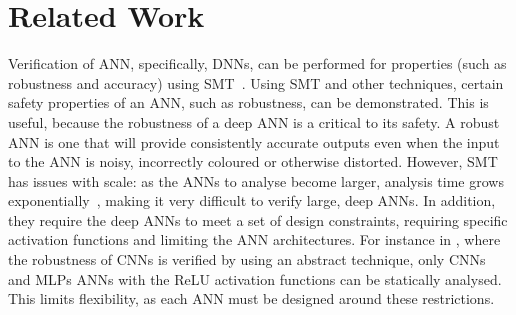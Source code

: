 \section{Related Work}
\label{sec:related}


Verification of \ac{ANN}, specifically, \acfp{DNN}, can be performed for properties (such as robustness and accuracy) using \ac{SMT}~\cite{Gehr2018AI2SA,reluplex,DeepANNverify}. 
Using \ac{SMT} and other techniques, certain safety properties of an \ac{ANN}, such as robustness, can be demonstrated. 
This is useful, because the robustness of a deep \ac{ANN} is a critical to its safety.
A robust \ac{ANN} is one that will provide consistently accurate outputs even when the input to the \ac{ANN} is noisy, incorrectly coloured or otherwise distorted. 
However, \ac{SMT} has issues with scale: as the \acp{ANN} to analyse become larger, analysis time grows exponentially~\cite{Gehr2018AI2SA}, making it very difficult to verify large, deep \acp{ANN}.
In addition, they require the deep \acp{ANN} to meet a set of design constraints, requiring specific activation functions and limiting the \ac{ANN} architectures.
For instance in \cite{Gehr2018AI2SA}, where the robustness of \acfp{CNN} is verified by using an abstract technique, only \acp{CNN} and \acp{MLP} \acp{ANN} with the \ac{ReLU} activation functions can be statically analysed.
This limits flexibility, as each \ac{ANN} must be designed around these restrictions. %

 






